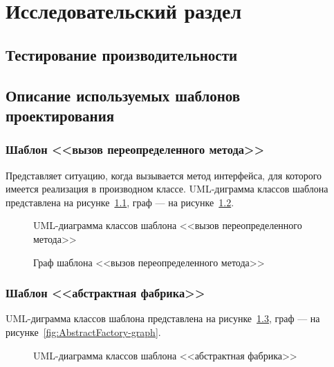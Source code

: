 \chapter{Исследовательский раздел}
\label{cha:research}

\section{Тестирование производительности}

\section{Описание используемых шаблонов проектирования}

\subsection{Шаблон <<вызов переопределенного метода>>}

Представляет ситуацию, когда вызывается метод интерфейса,
для которого имеется реализация в производном классе.
UML-диграмма классов шаблона представлена на рисунке~\ref{fig:OverriddenMethodCall-uml},
граф --- на рисунке~\ref{fig:OverriddenMethodCall-graph}.

\begin{figure}[!ht]
\centering
\caption{UML-диаграмма классов шаблона <<вызов переопределенного метода>>}
\label{fig:OverriddenMethodCall-uml}
\end{figure}

\begin{figure}[!ht]
\centering
\caption{Граф шаблона <<вызов переопределенного метода>>}
\label{fig:OverriddenMethodCall-graph}
\end{figure}

\subsection{Шаблон <<абстрактная фабрика>>}

UML-диграмма классов шаблона представлена на рисунке~\ref{fig:AbstractFactory-uml},
граф --- на рисунке~\ref{fig:AbstractFactory-graph}.

\begin{figure}[!ht]
\centering
\caption{UML-диаграмма классов шаблона <<абстрактная фабрика>>}
\label{fig:AbstractFactory-uml}
\end{figure}

